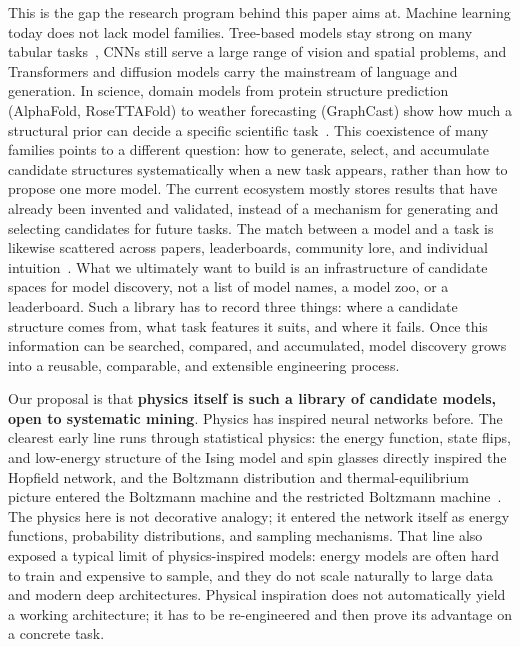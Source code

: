 \documentclass[11pt]{article}
\theoremstyle{definition}
\theoremstyle{plain}
\begin{document}
This is the gap the research program behind this paper aims at. Machine learning today does
not lack model families. Tree-based models stay strong on many tabular
tasks~\citep{grinsztajn2022tree}, CNNs still serve a large range of vision and spatial
problems, and Transformers and diffusion models carry the mainstream of language and
generation. In science, domain models from protein structure prediction (AlphaFold,
RoseTTAFold) to weather forecasting (GraphCast) show how much a structural prior can decide a
specific scientific task~\citep{jumper2021highly,baek2021accurate,lam2023learning}. This
coexistence of many families points to a different question: how to generate, select, and
accumulate candidate structures systematically when a new task appears, rather than how to
propose one more model. The current ecosystem mostly stores results that have already been
invented and validated, instead of a mechanism for generating and selecting candidates for
future tasks. The match between a model and a task is likewise scattered across papers,
leaderboards, community lore, and individual
intuition~\citep{lipton2018troubling,elsken2019neural,he2021automl,radosavovic2020designing}.
What we ultimately want to build is an infrastructure of candidate spaces for model
discovery, not a list of model names, a model zoo, or a leaderboard. Such a library has to
record three things: where a candidate structure comes from, what task features it suits,
and where it fails. Once this information can be searched, compared, and accumulated, model
discovery grows into a reusable, comparable, and extensible engineering process.

Our proposal is that \textbf{physics itself is such a library of candidate models, open to
systematic mining}. Physics has inspired neural networks before. The clearest early line
runs through statistical physics: the energy function, state flips, and low-energy structure
of the Ising model and spin glasses directly inspired the Hopfield network, and the Boltzmann
distribution and thermal-equilibrium picture entered the Boltzmann machine and the restricted
Boltzmann machine~\citep{hopfield1982neural,hinton1985learning,smolensky1986information}. The
physics here is not decorative analogy; it entered the network itself as energy functions,
probability distributions, and sampling mechanisms. That line also exposed a typical limit of
physics-inspired models: energy models are often hard to train and expensive to sample, and
they do not scale naturally to large data and modern deep architectures. Physical inspiration
does not automatically yield a working architecture; it has to be re-engineered and then prove
its advantage on a concrete task.
\end{document}
